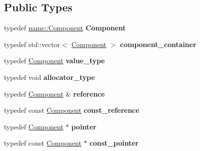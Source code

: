 \subsection*{Public Types}
\begin{DoxyCompactItemize}
\item 
typedef \hyperlink{classndn_1_1name_1_1Component}{name\+::\+Component} {\bfseries Component}\hypertarget{classndn_1_1Name_aacdc180010a9f94c36b70a549e35c6d2}{}\label{classndn_1_1Name_aacdc180010a9f94c36b70a549e35c6d2}

\item 
typedef std\+::vector$<$ \hyperlink{classndn_1_1name_1_1Component}{Component} $>$ {\bfseries component\+\_\+container}\hypertarget{classndn_1_1Name_a33176a4479eb3a6a344c3f9c313e0231}{}\label{classndn_1_1Name_a33176a4479eb3a6a344c3f9c313e0231}

\item 
typedef \hyperlink{classndn_1_1name_1_1Component}{Component} {\bfseries value\+\_\+type}\hypertarget{classndn_1_1Name_aecd0d59cc47b2113596ed8121f436a4d}{}\label{classndn_1_1Name_aecd0d59cc47b2113596ed8121f436a4d}

\item 
typedef void {\bfseries allocator\+\_\+type}\hypertarget{classndn_1_1Name_a65e4edb7555b5d2925877928a0270bac}{}\label{classndn_1_1Name_a65e4edb7555b5d2925877928a0270bac}

\item 
typedef \hyperlink{classndn_1_1name_1_1Component}{Component} \& {\bfseries reference}\hypertarget{classndn_1_1Name_aa7db8e4d8ddfc4aa5a4eeea58c341e4e}{}\label{classndn_1_1Name_aa7db8e4d8ddfc4aa5a4eeea58c341e4e}

\item 
typedef const \hyperlink{classndn_1_1name_1_1Component}{Component} {\bfseries const\+\_\+reference}\hypertarget{classndn_1_1Name_ad406bc3b6db058a613de89cb530c030c}{}\label{classndn_1_1Name_ad406bc3b6db058a613de89cb530c030c}

\item 
typedef \hyperlink{classndn_1_1name_1_1Component}{Component} $\ast$ {\bfseries pointer}\hypertarget{classndn_1_1Name_a013de22af5931f5f117a69d4892aa268}{}\label{classndn_1_1Name_a013de22af5931f5f117a69d4892aa268}

\item 
typedef const \hyperlink{classndn_1_1name_1_1Component}{Component} $\ast$ {\bfseries const\+\_\+pointer}\hypertarget{classndn_1_1Name_aba986bb2e61606302540f965c1537cff}{}\label{classndn_1_1Name_aba986bb2e61606302540f965c1537cff}


\end{DoxyCompactItemize}
